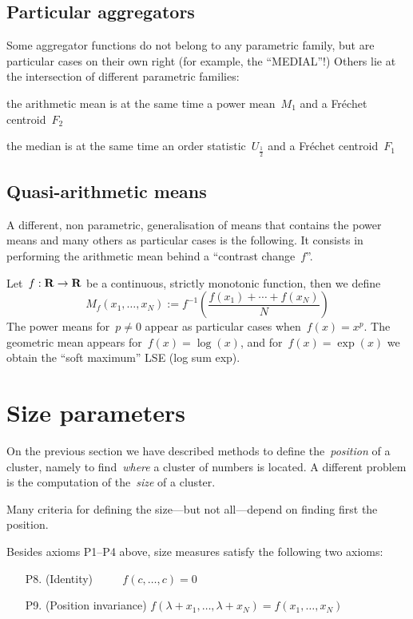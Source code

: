 \subsection{Particular aggregators}

Some aggregator functions do not belong to any parametric family, but
are particular cases on their own right
(for example, the ``MEDIAL''!) Others lie at the
intersection of different parametric families:

the arithmetic mean is at the same time a power mean~$M_1$ and a
Fréchet centroid~$F_2$

the median is at the same time an order statistic~$U_{\frac{1}{2}}$ and a
Fréchet centroid~$F_1$


\subsection{Quasi-arithmetic means}

A different, non parametric, generalisation of means that contains
the power means and many others as particular cases is the following.
It consists in performing the arithmetic mean behind a ``contrast
change~$f$''.

Let~$f:\mathbf{R}\to\mathbf{R}$ be a continuous, strictly monotonic function, then we
define
\[
	M_f(x_1,\ldots,x_N):=f^{-1}\left(\frac{f(x_1)+\cdots+f(x_N)}{N}\right)
\]
The power means for~$p\neq0$  appear as particular cases
when~$f(x)=x^p$.  The geometric mean appears for~$f(x)=\log(x)$, and
for~$f(x)=\exp(x)$ we obtain the ``soft maximum'' LSE (log sum exp).


\clearpage
\section{Size parameters}

On the previous section we have described methods to define
the~\emph{position} of a cluster, namely to find~\emph{where} a cluster of numbers is located.  A different
problem is the computation of the~\emph{size} of a cluster.

Many criteria for defining the size---but not all---depend on finding
first the position.

Besides axioms P1--P4 above, size measures satisfy the following two
axioms:
\begin{itemize}
	\item[P8.]
		(Identity)
		$\qquad$
		$f(c,\ldots,c)=0$
	\item[P9.]
		(Position invariance)
		$f(\lambda+x_1,\ldots,\lambda+x_N)
		=f(x_1,\ldots,x_N)$
\end{itemize}

